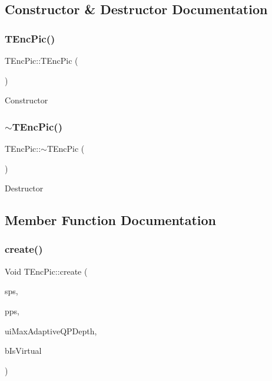 \subsection{Constructor \& Destructor Documentation}
\mbox{\label{class_t_enc_pic_a74d77b2632dc79a31a84eb9effd1aeb3}} 
\subsubsection{\texorpdfstring{T\+Enc\+Pic()}{TEncPic()}}
{\footnotesize\ttfamily T\+Enc\+Pic\+::\+T\+Enc\+Pic (\begin{DoxyParamCaption}{ }\end{DoxyParamCaption})}

Constructor \mbox{\label{class_t_enc_pic_ab26fb890ac1ef6c4e9791ffcf98bdb67}} 
\subsubsection{\texorpdfstring{$\sim$\+T\+Enc\+Pic()}{~TEncPic()}}
{\footnotesize\ttfamily T\+Enc\+Pic\+::$\sim$\+T\+Enc\+Pic (\begin{DoxyParamCaption}{ }\end{DoxyParamCaption})\hspace{0.3cm}{\ttfamily [virtual]}}

Destructor 

\subsection{Member Function Documentation}
\mbox{\label{class_t_enc_pic_a61fe02cef3a2756fc023b71edd83b7ef}} 
\subsubsection{\texorpdfstring{create()}{create()}}
{\footnotesize\ttfamily Void T\+Enc\+Pic\+::create (\begin{DoxyParamCaption}\item[{const \hyperlink{class_t_com_s_p_s}{T\+Com\+S\+PS} \&}]{sps,  }\item[{const \hyperlink{class_t_com_p_p_s}{T\+Com\+P\+PS} \&}]{pps,  }\item[{U\+Int}]{ui\+Max\+Adaptive\+Q\+P\+Depth,  }\item[{Bool}]{b\+Is\+Virtual }\end{DoxyParamCaption})}

